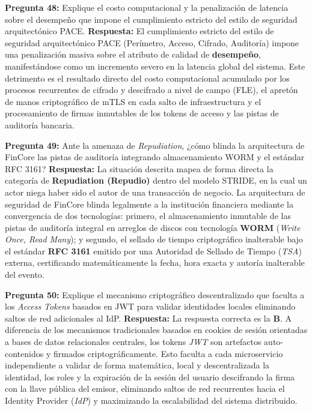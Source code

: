 \vspace{4mm}

\noindent\textbf{Pregunta 48:} Explique el costo computacional y la penalización de latencia sobre el desempeño que impone el cumplimiento estricto del estilo de seguridad arquitectónico PACE.
\newline
\textbf{Respuesta:} El cumplimiento estricto del estilo de seguridad arquitectónico PACE (Perímetro, Acceso, Cifrado, Auditoría) impone una penalización masiva sobre el atributo de calidad de \textbf{desempeño}, manifestándose como un incremento severo en la latencia global del sistema. Este detrimento es el resultado directo del costo computacional acumulado por los procesos recurrentes de cifrado y descifrado a nivel de campo (FLE), el apretón de manos criptográfico de mTLS en cada salto de infraestructura y el procesamiento de firmas inmutables de los tokens de acceso y las pistas de auditoría bancaria.

\vspace{4mm}

\noindent\textbf{Pregunta 49:} Ante la amenaza de \textit{Repudiation}, ¿cómo blinda la arquitectura de FinCore las pistas de auditoría integrando almacenamiento WORM y el estándar RFC 3161?
\newline
\textbf{Respuesta:} La situación descrita mapea de forma directa la categoría de \textbf{Repudiation (Repudio)} dentro del modelo STRIDE, en la cual un actor niega haber sido el autor de una transacción de negocio. La arquitectura de seguridad de FinCore blinda legalmente a la institución financiera mediante la convergencia de dos tecnologías: primero, el almacenamiento inmutable de las pistas de auditoría integral en arreglos de discos con tecnología \textbf{WORM} (\textit{Write Once, Read Many}); y segundo, el sellado de tiempo criptográfico inalterable bajo el estándar \textbf{RFC 3161} emitido por una Autoridad de Sellado de Tiempo (\textit{TSA}) externa, certificando matemáticamente la fecha, hora exacta y autoría inalterable del evento.

\vspace{4mm}

\noindent\textbf{Pregunta 50:} Explique el mecanismo criptográfico descentralizado que faculta a los \textit{Access Tokens} basados en JWT para validar identidades locales eliminando saltos de red adicionales al IdP.
\newline
\textbf{Respuesta:} La respuesta correcta es la \textbf{B}. A diferencia de los mecanismos tradicionales basados en cookies de sesión orientadas a bases de datos relacionales centrales, los tokens \textit{JWT} son artefactos auto-contenidos y firmados criptográficamente. Esto faculta a cada microservicio independiente a validar de forma matemática, local y descentralizada la identidad, los roles y la expiración de la sesión del usuario descifrando la firma con la llave pública del emisor, eliminando saltos de red recurrentes hacia el Identity Provider (\textit{IdP}) y maximizando la escalabilidad del sistema distribuido.